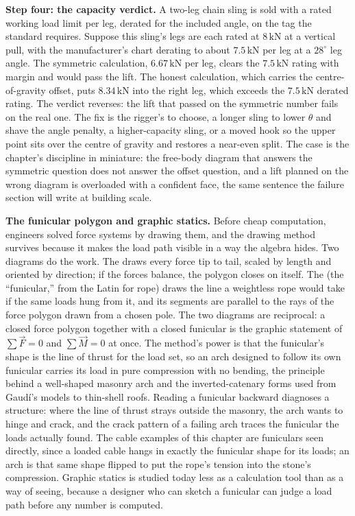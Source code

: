 \textbf{Step four: the capacity verdict.} A two-leg chain sling is sold with
a rated working load limit per leg, derated for the included angle, on the
tag the standard requires. Suppose this sling's legs are each rated at
$8\,\text{kN}$ at a vertical pull, with the manufacturer's chart derating to
about $7.5\,\text{kN}$ per leg at a $28^{\circ}$ leg angle. The symmetric
calculation, $6.67\,\text{kN}$ per leg, clears the $7.5\,\text{kN}$ rating
with margin and would pass the lift. The honest calculation, which carries
the centre-of-gravity offset, puts $8.34\,\text{kN}$ into the right leg,
which exceeds the $7.5\,\text{kN}$ derated rating. The verdict reverses: the
lift that passed on the symmetric number fails on the real one. The fix is
the rigger's to choose, a longer sling to lower $\theta$ and shave the angle
penalty, a higher-capacity sling, or a moved hook so the upper point sits
over the centre of gravity and restores a near-even split. The case is the
chapter's discipline in miniature: the free-body diagram that answers the
symmetric question does not answer the offset question, and a lift planned on
the wrong diagram is overloaded with a confident face, the same sentence the
failure section will write at building scale.

\begin{mastery}
\textbf{The funicular polygon and graphic statics.} Before cheap
computation, engineers solved force systems by drawing them, and the drawing
method survives because it makes the load path visible in a way the algebra
hides. Two diagrams do the work. The  draws every
force tip to tail, scaled by length and oriented by direction; if the forces
balance, the polygon closes on itself. The  (the
``funicular,'' from the Latin for rope) draws the line a weightless rope
would take if the same loads hung from it, and its segments are parallel to
the rays of the force polygon drawn from a chosen pole. The two diagrams are
reciprocal: a closed force polygon together with a closed funicular is the
graphic statement of $\sum\vec{F} = 0$ and $\sum\vec{M} = 0$ at once. The
method's power is that the funicular's shape is the line of thrust for the
load set, so an arch designed to follow its own funicular carries its load in
pure compression with no bending, the principle behind a well-shaped masonry
arch and the inverted-catenary forms used from Gaud\'i's models to thin-shell
roofs. Reading a funicular backward diagnoses a structure: where the line of
thrust strays outside the masonry, the arch wants to hinge and crack, and the
crack pattern of a failing arch traces the funicular the loads actually
found. The cable examples of this chapter are funiculars seen directly, since
a loaded cable hangs in exactly the funicular shape for its loads; an arch is
that same shape flipped to put the rope's tension into the stone's
compression. Graphic statics is studied today less as a calculation tool than
as a way of seeing, because a designer who can sketch a funicular can judge a
load path before any number is computed.
\end{mastery}

